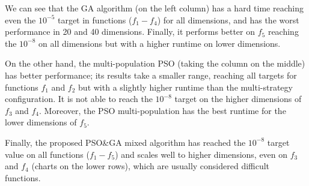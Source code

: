 We can see that the GA algorithm (on the left column) has a hard time reaching even the
$10^{-5}$ target in functions ($f_1-f_4$) for all dimensions, and has the worst
performance in 20 and 40 dimensions. Finally, it performs better on $f_5$
reaching the $10^{-8}$ on all dimensions but with a higher runtime on lower
dimensions.

On the other hand, the multi-population PSO (taking the column on the middle) 
has better performance; its results take a smaller range,
reaching all targets for functions $f_1$ and $f_2$ but with a slightly higher
runtime than the multi-strategy configuration. It is not able to reach the
$10^{-8}$ target on the higher dimensions of $f_3$ and $f_4$. Moreover, the PSO
multi-population has the best runtime for the lower dimensions of $f_5$.

Finally, the proposed PSO\&GA mixed algorithm has reached the $10^{-8}$ target
value on all functions ($f_1-f_5$) and scales well to higher dimensions, even
on $f_3$ and $f_4$ (charts on the lower rows), which are usually considered difficult functions. 



